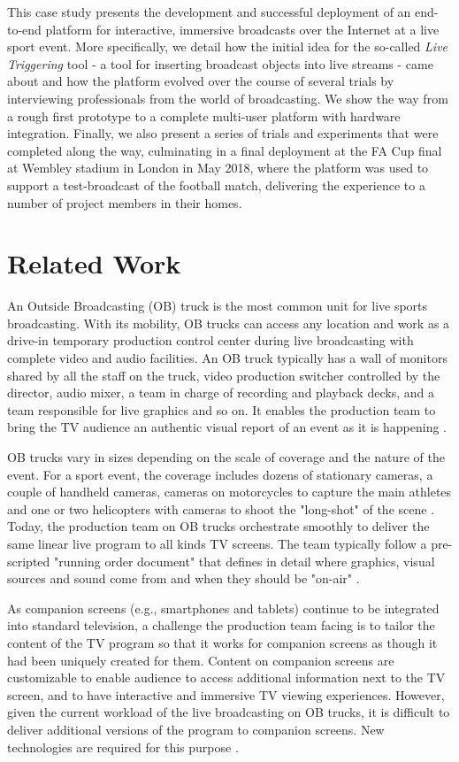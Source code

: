 \documentclass[sigchi-a, authorversion]{acmart}
\begin{document}
 This case study presents the development and successful deployment of an end-to-end platform for interactive, immersive broadcasts over the Internet at a live sport event. More specifically, we detail how the initial idea for the so-called \emph{Live Triggering} tool - a tool for inserting broadcast objects into live streams - came about and how the platform evolved over the course of several trials by interviewing professionals from the world  of broadcasting. We show the way from a rough first prototype to a complete multi-user platform with hardware integration. Finally, we also present a series of trials and experiments that were completed along the way,  culminating in a final deployment at the FA Cup final at Wembley stadium in London in May 2018, where the platform was used to support a test-broadcast of the football match, delivering the experience to a number of project members in their homes.

\section{Related Work}
An Outside Broadcasting (OB) truck is the most common unit for live sports broadcasting. With its mobility, OB trucks can access any location and work as a drive-in temporary production control center during live broadcasting with complete video and audio facilities. An OB truck typically has a wall of monitors shared by all the staff on the truck, video production switcher controlled by the director, audio mixer, a team in charge of recording and playback decks, and a team responsible for live graphics and so on. It enables the production team to bring the TV audience an authentic visual report of an event as it is happening \cite{owens2012, owens2015}.

OB trucks vary in sizes depending on the scale of coverage and the nature of the event. For a sport event, the coverage includes dozens of stationary cameras, a couple of handheld cameras, cameras on motorcycles to capture the main athletes and one or two helicopters with cameras to shoot the "long-shot" of the scene \cite{owens2012, Li:2018_TVX}. Today, the production team on OB trucks orchestrate smoothly to deliver the same linear live program to all kinds TV screens. The team typically follow a pre-scripted "running order document" that defines in detail where graphics, visual sources and sound come from and when they should be "on-air" \cite{Li:2018_TVX}. 

As companion screens (e.g., smartphones and tablets) continue to be integrated into standard television, a challenge the production team facing is to tailor the content of the TV program so that it works for companion screens as though it had been uniquely created for them. Content on companion screens are customizable to enable audience to access additional information next to the TV screen, and to have interactive and immersive TV viewing experiences\cite{bentley2017, dowell2015}. However, given the current workload of the live broadcasting on OB trucks, it is difficult to deliver additional versions of the program to companion screens. New technologies are required for this purpose \cite{Li:2018_TVX, armstrong2014}.
\end{document}
